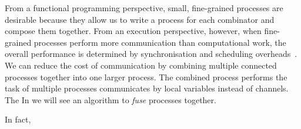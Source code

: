
From a functional programming perspective, small, fine-grained processes are desirable because they allow us to write a process for each combinator and compose them together.
From an execution perspective, however, when fine-grained processes perform more communication than computational work, the overall performance is determined by synchronisation and scheduling overheads~\cite{chen1990impact}.
We can reduce the cost of communication by combining multiple connected processes together into one larger process.
The combined process performs the task of multiple processes communicates by local variables instead of channels.
The
In  we will see an algorithm to \emph{fuse} processes together.

In fact, 




